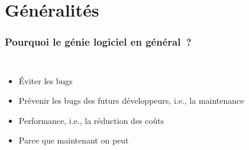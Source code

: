 \documentclass{beamer}
\begin{document}
    \section{Généralités}
    \begin{frame}
        \transdissolve
        \frametitle{Pourquoi le génie logiciel en général~?}
        \begin{columns}
            \begin{itemize}

                \item Éviter les bugs
                \item Prévenir les bugs des futurs développeurs, i.e., la maintenance
                \item Performance, i.e., la réduction des coûts
                \item Parce que maintenant on peut
            \end{itemize}
            \centering
        \end{columns}
    \end{frame}
\end{document}

